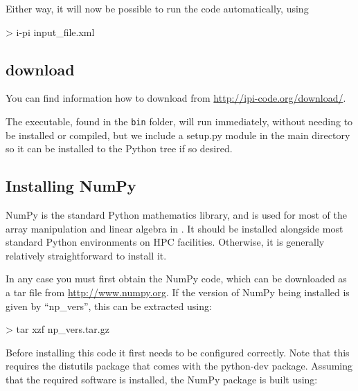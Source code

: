 \documentclass[11pt,english,fleqn]{report}
\newenvironment{code}{%
\footnotesize 
\verbatim
}{
\endverbatim
\normalsize
}
\begin{document}
Either way, it will now be possible to run the code automatically, using

\begin{code}
> i-pi input_file.xml
\end{code}

\subsection{\ipi download}

%
%

You can find information how to download \ipi from \url{http://ipi-code.org/download/}.

%

The \ipi executable, found in the \texttt{bin} folder,  will run immediately, without needing to be installed
or compiled, but we include a setup.py module in the main directory so it can
be installed to the Python tree if so desired.

\subsection{Installing NumPy}

NumPy is the standard Python mathematics library, and is used for
most of the array manipulation and linear algebra in \ipi. It should
be installed alongside most standard Python environments on HPC facilities.
Otherwise, it is generally relatively straightforward to install it. 

In any case you must first obtain the NumPy code, which can be downloaded
as a tar file from \url{http://www.numpy.org}. If the version of
NumPy being installed is given by {}``np\_vers'', this can be extracted
using:

\begin{code}
> tar xzf np_vers.tar.gz
\end{code}

Before installing this code it first needs to be configured correctly.
Note that this requires the distutils package that comes with the
python-dev package. Assuming that the required software is installed,
the NumPy package is built using:
\end{document}
